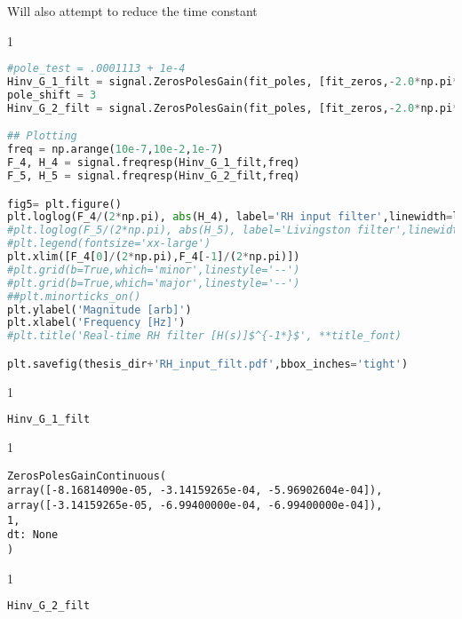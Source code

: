 Will also attempt to reduce the time constant

\begin{spacing}{1} \begin{lstlisting}[language=Python]
#pole_test = .0001113 + 1e-4
Hinv_G_1_filt = signal.ZerosPolesGain(fit_poles, [fit_zeros,-2.0*np.pi*.0001113129672, -2.0*np.pi*.0001113129672],1)
pole_shift = 3
Hinv_G_2_filt = signal.ZerosPolesGain(fit_poles, [fit_zeros,-2.0*np.pi*.0001113129672*pole_shift, -2.0*np.pi*.0001113129672*pole_shift],1)

## Plotting
freq = np.arange(10e-7,10e-2,1e-7)
F_4, H_4 = signal.freqresp(Hinv_G_1_filt,freq)
F_5, H_5 = signal.freqresp(Hinv_G_2_filt,freq)

fig5= plt.figure()
plt.loglog(F_4/(2*np.pi), abs(H_4), label='RH input filter',linewidth=lin_thickness)
#plt.loglog(F_5/(2*np.pi), abs(H_5), label='Livingston filter',linewidth=lin_thickness)
#plt.legend(fontsize='xx-large')
plt.xlim([F_4[0]/(2*np.pi),F_4[-1]/(2*np.pi)])
#plt.grid(b=True,which='minor',linestyle='--')
#plt.grid(b=True,which='major',linestyle='--')
##plt.minorticks_on()
plt.ylabel('Magnitude [arb]')
plt.xlabel('Frequency [Hz]')
#plt.title('Real-time RH filter [H(s)]$^{-1*}$', **title_font)

plt.savefig(thesis_dir+'RH_input_filt.pdf',bbox_inches='tight')
\end{lstlisting} \end{spacing}


\begin{spacing}{1} \begin{lstlisting}[language=Python]
Hinv_G_1_filt
\end{lstlisting} \end{spacing}

\begin{spacing}{1} \begin{lstlisting}
ZerosPolesGainContinuous(
array([-8.16814090e-05, -3.14159265e-04, -5.96902604e-04]),
array([-3.14159265e-05, -6.99400000e-04, -6.99400000e-04]),
1,
dt: None
)
\end{lstlisting} \end{spacing}

\begin{spacing}{1} \begin{lstlisting}[language=Python]
Hinv_G_2_filt
\end{lstlisting} \end{spacing}

